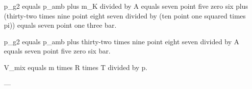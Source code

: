 p_g2 equals p_amb plus m_K divided by A equals seven point five zero six plus (thirty-two times nine point eight seven divided by (ten point one squared times pi)) equals seven point one three bar.  

p_g2 equals p_amb plus thirty-two times nine point eight seven divided by A equals seven point five zero six bar.  

V_mix equals m times R times T divided by p.  

---
